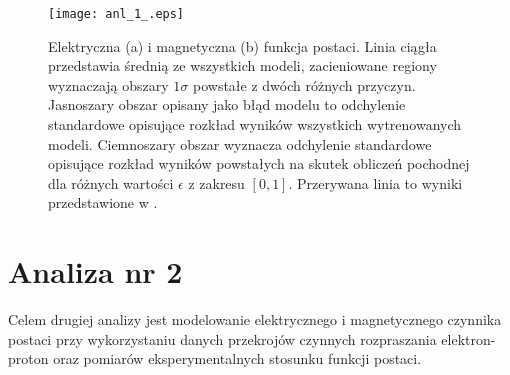 \documentclass[11pt]{book}
\theoremstyle{definition}
\begin{document}
%
\begin{figure}[htp!]
	\centering
	\texttt{[image: anl\_1\_.eps]}
	\caption{Elektryczna (a) i magnetyczna (b) funkcja postaci. Linia ciągła przedstawia średnią ze wszystkich modeli, zacieniowane regiony wyznaczają obszary $1\sigma$ powstałe z dwóch różnych przyczyn. Jasnoszary obszar opisany jako błąd modelu to odchylenie standardowe opisujące rozkład wyników wszystkich wytrenowanych modeli. Ciemnoszary obszar wyznacza odchylenie standardowe opisujące rozkład wyników powstałych na skutek obliczeń pochodnej dla różnych wartości $\epsilon$ z zakresu $[0,1]$. Przerywana linia to wyniki przedstawione w \cite{2009PhRvC..79f5204A}.}
	\label{fig:ff1}
\end{figure}

\newpage

\section{Analiza nr 2}

Celem drugiej analizy jest modelowanie elektrycznego i magnetycznego czynnika postaci przy wykorzystaniu danych przekrojów czynnych rozpraszania elektron-proton oraz pomiarów eksperymentalnych stosunku funkcji postaci.
\end{document}
